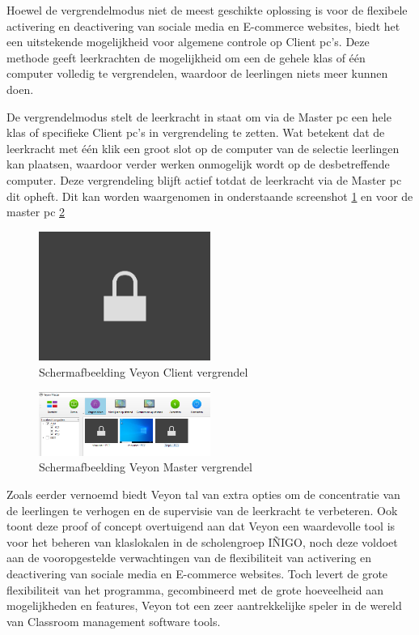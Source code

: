 Hoewel de vergrendelmodus niet de meest geschikte oplossing is voor de flexibele activering en deactivering van sociale media en E-commerce websites, biedt het een uitstekende mogelijkheid voor algemene controle op Client pc's. Deze methode geeft leerkrachten de mogelijkheid om een de gehele klas of één computer volledig te vergrendelen, waardoor de leerlingen niets meer kunnen doen. \newline

De vergrendelmodus stelt de leerkracht in staat om via de Master pc een hele klas of specifieke Client pc's in vergrendeling te zetten. Wat betekent dat de leerkracht met één klik een groot slot op de computer van de selectie leerlingen kan plaatsen, waardoor verder werken onmogelijk wordt op de desbetreffende computer. Deze vergrendeling blijft actief totdat de leerkracht via de Master pc dit opheft. Dit kan worden waargenomen in onderstaande screenshot \ref{fig:Schermafbeelding Veyon Client vergrendel} en voor de master pc \ref{fig:Schermafbeelding Veyon Master vergrendel}

\begin{figure}[h]
    \centering
    \includegraphics[width=0.5\textwidth]{graphics/Schermafbeelding vergrendeling client.png}
    \caption{Schermafbeelding Veyon Client vergrendel}
    \label{fig:Schermafbeelding Veyon Client vergrendel} 
\end{figure}

\begin{figure}[h]
    \centering
    \includegraphics[width=0.5\textwidth]{graphics/SchermafbeeldingvergrendelmodusMaster.png}
    \caption{Schermafbeelding Veyon Master vergrendel}
    \label{fig:Schermafbeelding Veyon Master vergrendel} 
\end{figure}

Zoals eerder vernoemd biedt Veyon tal van extra opties om de concentratie van de leerlingen te verhogen en de supervisie van de leerkracht te verbeteren. Ook toont deze proof of concept overtuigend aan dat Veyon een waardevolle tool is voor het beheren van klaslokalen in de scholengroep IÑIGO, noch deze voldoet aan de vooropgestelde verwachtingen van de flexibiliteit van activering en deactivering van sociale media en E-commerce websites. Toch levert de grote flexibiliteit van het programma, gecombineerd met de grote hoeveelheid aan mogelijkheden en features, Veyon tot een zeer aantrekkelijke speler in de wereld van Classroom management software tools.

